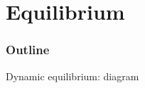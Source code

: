 \documentclass{beamer}
\begin{document}
\section{Equilibrium}
\begin{frame}
\frametitle{Outline}
\tableofcontents[currentsubsection]
\end{frame}
\begin{frame}{Dynamic equilibrium: diagram}
\begin{center}
\vspace{-5mm}
\begin{figure}[h!]
\end{figure}
\end{center}
\end{frame}
\end{document}
